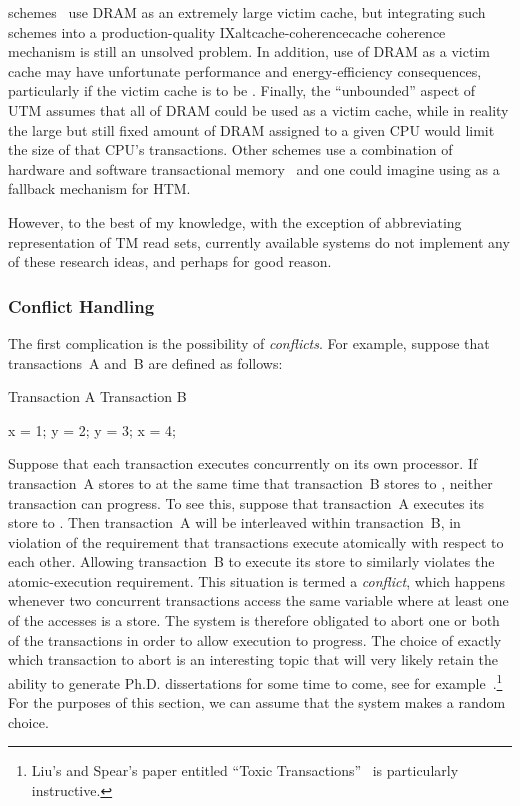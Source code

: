 schemes~\cite{CScottAnanian2006,KevinEMoore2006}
use DRAM as an extremely large victim cache, but integrating such schemes
into a production-quality
IXalt{cache-coherence}{cache coherence} mechanism is still an unsolved
problem.
In addition, use of DRAM as a victim cache may have unfortunate
performance and energy-efficiency consequences, particularly
if the victim cache is to be
.
Finally, the ``unbounded'' aspect of UTM assumes that all of DRAM
could be used as a victim cache, while in reality
the large but still fixed amount of DRAM assigned to a given CPU
would limit the size of that CPU's transactions.
Other schemes use a combination of hardware and software transactional
memory~\cite{SanjeevKumar2006} and one could imagine using  as a
fallback mechanism for HTM\@.

However, to the best of my knowledge, with the exception of abbreviating
representation of TM read sets, currently available systems do not
implement any of these research ideas, and perhaps for good reason.

\subsubsection{Conflict Handling}
\label{sec:future:Conflict Handling}

The first complication is the possibility of \emph{conflicts}.
For example, suppose that transactions~A and~B are defined as follows:

\begin{VerbatimU}
Transaction A       Transaction B

x = 1;              y = 2;
y = 3;              x = 4;
\end{VerbatimU}

Suppose that each transaction executes concurrently on its own processor.
If transaction~A stores to  at the same time that transaction~B
stores to , neither transaction can progress.
To see this, suppose that transaction~A executes its store to .
Then transaction~A will be interleaved within transaction~B, in violation
of the requirement that transactions execute atomically with respect to
each other.
Allowing transaction~B to execute its store to  similarly violates
the atomic-execution requirement.
This situation is termed a \emph{conflict}, which happens whenever two
concurrent transactions access the same variable where at least one of
the accesses is a store.
The system is therefore obligated to abort one or both of the transactions
in order to allow execution to progress.
The choice of exactly which transaction to abort is an interesting topic
that will very likely retain the ability to generate Ph.D. dissertations for
some time to come, see for
example~\cite{EgeAkpinar2011HTM2TLE}.\footnote{
	Liu's and Spear's paper entitled ``Toxic
	Transactions''~\cite{YujieLiu2011ToxicTransactions} is
	particularly instructive.}
For the purposes of this section, we can assume that the system makes
a random choice.

